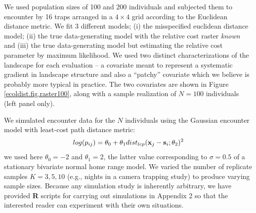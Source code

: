 \documentclass[12pt]{article}
\begin{document}
We used population sizes of 100 and 200 individuals and subjected them
to encounter by 16 traps arranged in a $4\times 4$ grid according to
the Euclidean distance metric. We fit 3 different models; (i) the
misspecified euclidean distance model; (ii) the true data-generating
model with the relative cost raster {\it known} and (iii) the true
data-generating model but estimating the relative cost parameter by
maximum likelihood.  We used two distinct characterizations of the
landscape for each evaluation -- a covariate meant to represent a
systematic gradient in landscape structure and also a ``patchy''
covariate which we believe is probably more typical in practice. The
two covariates are shown in Figure \ref{ecoldist.fig.raster100}, along
with a sample realization of $N=100$ individuals (left panel only).

We simulated encounter data for the $N$ individuals using the Gaussian
encounter model with least-cost path distance metric:
\[
log(p_{ij})= \theta_{0} + \theta_{1} dist_{lcp}({\bf x}_{j} - {\bf
  s}_{i}; \theta_{2})^{2}
\]
we used here $\theta_{0} = -2$ and $\theta_{1} = 2$, the latter value
corresponding to $\sigma = 0.5$ of a stationary bivariate normal home
range model.  We varied the number of replicate samples $K=3,5,10$
(e.g., nights in a camera trapping study) to produce varying sample
sizes.  Because any simulation study is inherently arbitrary, we have
provided {\bf R} scripts for carrying out simulations in Appendix 2 so
that the interested reader can experiment with their own situations.
\end{document}
